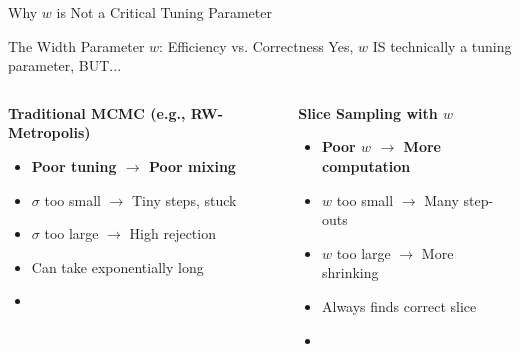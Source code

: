 \documentclass[aspectratio=169]{beamer}
\begin{document}
\begin{frame}{Why $w$ is Not a Critical Tuning Parameter}

	\begin{block}{The Width Parameter $w$: Efficiency vs. Correctness}
		Yes, $w$ IS technically a tuning parameter, BUT...
	\end{block}

	\begin{columns}[T]
		\begin{column}{0.48\textwidth}
			\textbf{Traditional MCMC (e.g., RW-Metropolis)}
			\begin{itemize}
				\item \textbf{Poor tuning $\rightarrow$ Poor mixing}
				\item $\sigma$ too small $\rightarrow$ Tiny steps, stuck
				\item $\sigma$ too large $\rightarrow$ High rejection
				\item Can take exponentially long
				\item {}
			\end{itemize}
		\end{column}
		\begin{column}{0.48\textwidth}
			\textbf{Slice Sampling with $w$}
			\begin{itemize}
				\item \textbf{Poor $w$ $\rightarrow$ More computation}
				\item $w$ too small $\rightarrow$ Many step-outs
				\item $w$ too large $\rightarrow$ More shrinking
				\item Always finds correct slice
				\item {}
			\end{itemize}
		\end{column}
	\end{columns}
\end{frame}
\end{document}
